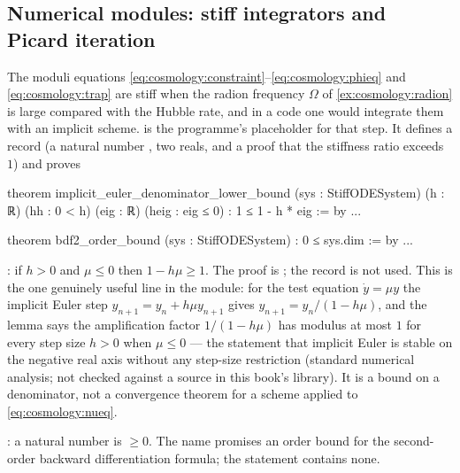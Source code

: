 \subsection{Numerical modules: stiff integrators and Picard iteration}

The moduli equations \eqref{eq:cosmology:constraint}--\eqref{eq:cosmology:phieq} and
\eqref{eq:cosmology:trap} are stiff when the radion frequency $\Omega$ of
\cref{ex:cosmology:radion} is large compared with the Hubble rate, and in a code one would
integrate them with an implicit scheme. 
is the programme's placeholder for that step. It defines a record 
(a natural number , two reals, and a proof that the stiffness ratio exceeds $1$)
and proves
\begin{leancode}
theorem implicit_euler_denominator_lower_bound (sys : StiffODESystem) (h : ℝ)
    (hh : 0 < h) (eig : ℝ) (heig : eig ≤ 0) :
    1 ≤ 1 - h * eig := by ...

theorem bdf2_order_bound (sys : StiffODESystem) :
    0 ≤ sys.dim := by ...
\end{leancode}
\begin{leanbox}
: if $h>0$ and $\mu\le0$ then
$1-h\mu\ge1$. The proof is ; the record  is not used. This is the
one genuinely useful line in the module: for the test equation $\dot y=\mu y$ the implicit
Euler step $y_{n+1}=y_n+h\mu y_{n+1}$ gives $y_{n+1}=y_n/(1-h\mu)$, and the lemma says the
amplification factor $1/(1-h\mu)$ has modulus at most $1$ for every step size $h>0$ when
$\mu\le0$ --- the statement that implicit Euler is stable on the negative real axis
without any step-size restriction (standard numerical analysis; not checked against a source
in this book's library). It is a bound on a denominator, not a convergence theorem for a
scheme applied to \eqref{eq:cosmology:nueq}.

: a natural number is $\ge0$. The name promises an order bound for the
second-order backward differentiation formula; the statement contains none.
\end{leanbox}

